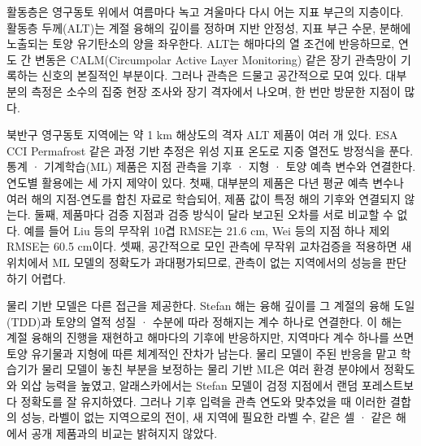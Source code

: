 활동층은 영구동토 위에서 여름마다 녹고 겨울마다 다시 어는 지표 부근의 지층이다. 활동층 두께(ALT)는 계절 융해의 깊이를 정하며 지반 안정성, 지표 부근 수문, 분해에 노출되는 토양 유기탄소의 양을 좌우한다\cite{Hjort2018,Schuur2015,Biskaborn2019}. ALT는 해마다의 열 조건에 반응하므로, 연도 간 변동은 CALM(Circumpolar Active Layer Monitoring) 같은 장기 관측망이 기록하는 신호의 본질적인 부분이다\cite{Nelson1997,Streletskiy2025}. 그러나 관측은 드물고 공간적으로 모여 있다. 대부분의 측정은 소수의 집중 현장 조사와 장기 격자에서 나오며, 한 번만 방문한 지점이 많다\cite{Moore2025,Veremeeva2025}.

북반구 영구동토 지역에는 약 1 km 해상도의 격자 ALT 제품이 여러 개 있다. ESA CCI Permafrost 같은 과정 기반 추정은 위성 지표 온도로 지중 열전도 방정식을 푼다\cite{Westermann2024,Westermann2025}. 통계 · 기계학습(ML) 제품은 지점 관측을 기후 · 지형 · 토양 예측 변수와 연결한다\cite{Aalto2018,Ran2022a,Liu2024,Wei2026}. 연도별 활용에는 세 가지 제약이 있다. 첫째, 대부분의 제품은 다년 평균 예측 변수나 여러 해의 지점-연도를 합친 자료로 학습되어, 제품 값이 특정 해의 기후와 연결되지 않는다. 둘째, 제품마다 검증 지점과 검증 방식이 달라 보고된 오차를 서로 비교할 수 없다. 예를 들어 Liu 등의 무작위 10겹 RMSE는 21.6 cm\cite{Liu2024}, Wei 등의 지점 하나 제외 RMSE는 60.5 cm\cite{Wei2026}이다. 셋째, 공간적으로 모인 관측에 무작위 교차검증을 적용하면 새 위치에서 ML 모델의 정확도가 과대평가되므로\cite{Roberts2017,Ploton2020,MeyerPebesma2022,Wadoux2021}, 관측이 없는 지역에서의 성능을 판단하기 어렵다.

물리 기반 모델은 다른 접근을 제공한다. Stefan 해는 융해 깊이를 그 계절의 융해 도일(TDD)과 토양의 열적 성질 · 수분에 따라 정해지는 계수 하나로 연결한다\cite{Stefan1891,Riseborough2008,Nelson1997}. 이 해는 계절 융해의 진행을 재현하고 해마다의 기후에 반응하지만, 지역마다 계수 하나를 쓰면 토양 유기물과 지형에 따른 체계적인 잔차가 남는다. 물리 모델이 주된 반응을 맡고 학습기가 물리 모델이 놓친 부분을 보정하는 물리 기반 ML은 여러 환경 분야에서 정확도와 외삽 능력을 높였고\cite{Willard2022,Read2019,Jia2021}, 알래스카에서는 Stefan 모델이 검정 지점에서 랜덤 포레스트보다 정확도를 잘 유지하였다\cite{Gautam2025}. 그러나 기후 입력을 관측 연도와 맞추었을 때 이러한 결합의 성능, 라벨이 없는 지역으로의 전이, 새 지역에 필요한 라벨 수, 같은 셀 · 같은 해에서 공개 제품과의 비교는 밝혀지지 않았다.

